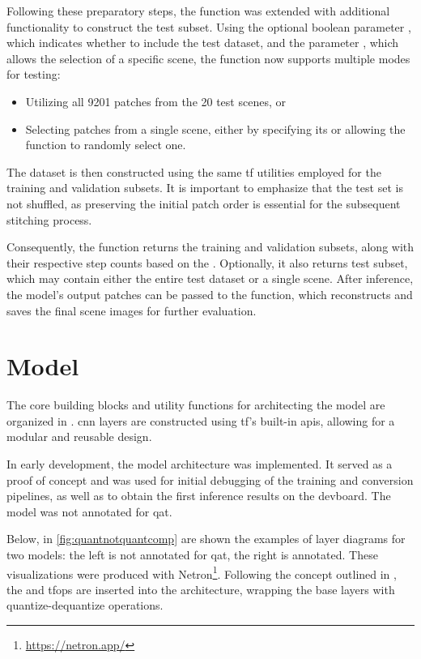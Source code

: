 {Following these preparatory steps, the  function was extended with additional functionality to construct the test subset.
Using the optional boolean parameter , which indicates whether to include the test dataset, and the parameter ,
which allows the selection of a specific scene, the function now supports multiple modes for testing:

\begin{itemize}
    \item Utilizing all 9201 patches from the 20 test scenes, or
    \item Selecting patches from a single scene, either by specifying its  or allowing the function to randomly select one.
\end{itemize}

The dataset is then constructed using the same \gls{tf} utilities employed for the training and validation subsets.
It is important to emphasize that the test set is not shuffled, as preserving the initial patch order is essential for the subsequent stitching process.

Consequently, the  function returns the training and validation subsets, along with their respective step counts based on the .
Optionally, it also returns test subset, which may contain either the entire test dataset or a single scene.
After inference, the model's output patches can be passed to the  function, which reconstructs and saves the final scene images for further evaluation.

\clearpage
\section{Model}
\label{sec:model}

The core building blocks and utility functions for architecting the model are organized in .
\gls{cnn} layers are constructed using \gls{tf}'s built-in \glspl{api}, allowing for a modular and reusable design.

In early development, the  model architecture was implemented.
It served as a proof of concept and was used for initial debugging of the training and conversion pipelines, as well as to obtain the first inference results on the \gls{devboard}.
The model was not annotated for \gls{qat}.

Below, in \autoref{fig:quantnotquantcomp} are shown the examples of layer diagrams for two models: the left is not annotated for \gls{qat}, the right is annotated.
These visualizations were produced with Netron\footnote{\url{https://netron.app/}}.
Following the concept outlined in , the  and  \glspl{tfop} are inserted into the architecture,
wrapping the base layers with quantize-dequantize operations.

}
